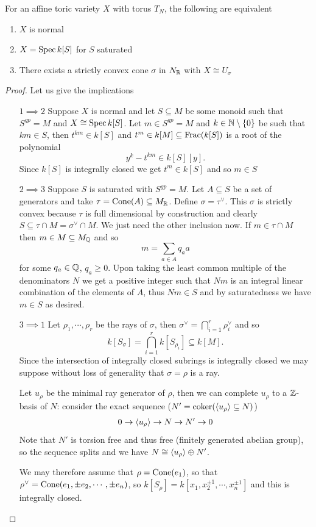 \begin{proposition}[]\label{PrCriteriaForNormalAffineToricVariety}
For an affine toric variety $X$ with torus $T_N$, the following are equivalent
\begin{enumerate}
\item $X$ is normal
\item $X=\operatorname{Spec} k[S]$ for $S$ saturated
\item There exists a strictly convex cone $\sigma$ in $N_{\mathbb{R}}$ with $X\cong U_{\sigma}$
\end{enumerate}
\end{proposition}
\begin{proof}
Let us give the implications
\setlength{\leftmargini}{0cm}
\begin{itemize}
\item[$\boxed{1\implies2}$] Suppose $X$ is normal and let $S\subseteq M$ be some monoid such that $S^{gp}=M$ and $X\cong \operatorname{Spec} k[S]$. Let $m\in S^{gp}=M$ and $k\in\mathbb{N}\setminus\{0\}$ be such that $km\in S$, then $t^{km}\in k[S]$ and $t^m\in k[M]\subseteq \operatorname{Frac}(k[S])$ is a root of the polynomial
\[y^k-t^{km}\in k[S][y].\]
Since $k[S]$ is integrally closed we get $t^m\in k[S]$ and so $m\in S$
\item[$\boxed{2\implies3}$] Suppose $S$ is saturated with $S^{gp}=M$. Let $A\subseteq S$ be a set of generators and take $\tau=\mathrm{Cone}(A)\subseteq M_{\mathbb{R}}$. Define $\sigma=\tau^\vee$. This $\sigma$ is strictly convex because $\tau$ is full dimensional by construction and clearly $S\subseteq \tau\cap M=\sigma^\vee\cap M$. We just need the other inclusion now. If $m\in \tau\cap M$ then $m\in M\subseteq M_{\mathbb{Q}}$ and so
\[m=\sum_{a\in A}q_a a\]
for some $q_a\in \mathbb{Q}$, $q_a\geq 0$. Upon taking the least common multiple of the denominators $N$ we get a positive integer such that $Nm$ is an integral linear combination of the elements of $A$, thus $Nm\in S$ and by saturatedness we have $m\in S$ as desired.
\item[$\boxed{3\implies1}$] Let $\rho_1,\cdots, \rho_r$ be the rays of $\sigma$, then $\sigma^\vee=\bigcap_{i=1}^r\rho_i^\vee$ and so
\[k[S_\sigma]=\bigcap_{i=1}^r k[S_{\rho_i}]\subseteq k[M].\]
Since the intersection of integrally closed subrings is integrally closed we may suppose without loss of generality that $\sigma=\rho$ is a ray. 

Let $u_\rho$ be the minimal ray generator of $\rho$, then we can complete $u_\rho$ to a $\mathbb{Z}$-basis of $N$: consider the exact sequence ($N'=\operatorname{coker}(\left\langle {u_\rho}\right\rangle\subseteq N)$)
\[0\to \left\langle {u_\rho}\right\rangle\to N\to N'\to 0\]
Note that $N'$ is torsion free and thus free (finitely generated abelian group), so the sequence splits and we have $N\cong \left\langle {u_\rho}\right\rangle\oplus N'$.

We may therefore assume that $\rho=\mathrm{Cone}(e_1)$, so that $\rho^\vee=\mathrm{Cone}(e_1,\pm e_2,\cdots, \pm e_n)$, so $k[S_\rho]=k[x_1,x_2^{\pm 1},\cdots, x_n^{\pm 1}]$ and this is integrally closed.
\end{itemize}
\setlength{\leftmargini}{0.5cm}
\end{proof}



